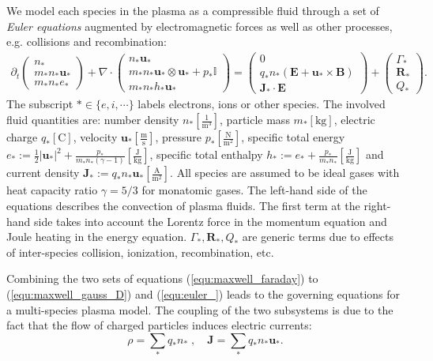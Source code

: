 \documentclass{article}
\begin{document}
We model each species in the plasma as a compressible fluid through a set of \emph{Euler
  equations} augmented by electromagnetic forces as well as other processes,
e.g. collisions and recombination:
\begin{align} \label{equ:euler_}
    \partial_t
    \begin{pmatrix}
    n_* \\
    m_*n_* \mathbf{u}_* \\
    m_*n_* e_*
    \end{pmatrix}
    + \nabla \cdot
    \begin{pmatrix}
    n_* \mathbf{u}_* \\
    m_*n_* \mathbf{u}_* \otimes \mathbf{u}_* + p_*\mathbb{I} \\
    m_*n_* h_* \mathbf{u}_*
    \end{pmatrix}
    =
    \begin{pmatrix}
    0 \\
    q_*n_*(\mathbf{E} + \mathbf{u}_* \times \mathbf{B}) \\
    \mathbf{J}_* \cdot \mathbf{E}
    \end{pmatrix}
    +
    \begin{pmatrix}
    \Gamma_* \\
    \mathbf{R}_* \\
    Q_*
    \end{pmatrix}.
\end{align}
The subscript $*\in \{e, i, \cdots\}$ labels electrons, ions or other species. The
involved fluid quantities are: number density $n_*[\frac{1}{\text{m}^3}]$, particle mass
$m_*[\text{kg}]$, electric charge $q_*[\text{C}]$, velocity
$\mathbf{u}_*[\frac{\text{m}}{\text{s}}]$, pressure $p_*[\frac{\text{N}}{\text{m}^2}]$,
specific total energy
$e_* := \frac{1}{2}|\mathbf{u}_*|^2 + \frac{p_*}{m_*n_*(\gamma -
  1)}[\frac{\text{J}}{\text{kg}}]$, specific total enthalpy
$h_* := e_* + \frac{p_*}{m_*n_*}[\frac{\text{J}}{\text{kg}}]$ and current density
$\mathbf{J}_* := q_*n_*\mathbf{u}_*[\frac{\text{A}}{\text{m}^2}]$. All species are
assumed to be ideal gases with heat capacity ratio $\gamma=5/3$ for monatomic gases. The
left-hand side of the equations describes the convection of plasma fluids. The first term
at the right-hand side takes into account the Lorentz force in the momentum equation and
Joule heating in the energy equation. $\Gamma_*, \mathbf{R}_*, Q_*$ are generic terms due
to effects of inter-species collision, ionization, recombination, etc.

Combining the two sets of equations (\ref{equ:maxwell_faraday}) to
(\ref{equ:maxwell_gauss_D}) and (\ref{equ:euler_}) leads to the governing equations for a
multi-species plasma model. The coupling of the two subsystems is due to the fact that the
flow of charged particles induces electric currents:
\begin{equation} \label{equ:maxwell_euler_coupling}
    \rho = \sum_* q_*n_*\;, \quad \mathbf{J} = \sum_* q_*n_*\mathbf{u}_*. 
\end{equation}
\end{document}
